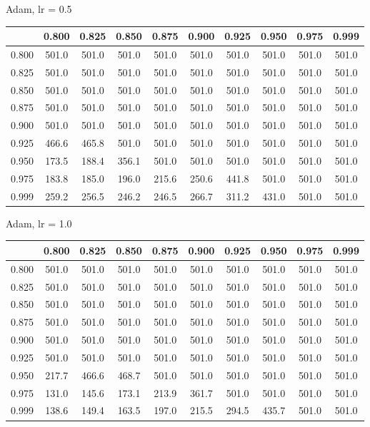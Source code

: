 \documentclass[a4paper,14pt,oneside,openany]{memoir}
\begin{document}
	Adam, lr = 0.5 
	
	\begin{tabular}{|c|c|c|c|c|c|c|c|c|c|}
	\hline 
	 &0.800 &0.825 &0.850 &0.875 &0.900 &0.925 &0.950 &0.975 &0.999 \\
	 \hline 
	0.800 &501.0 &501.0 &501.0 &501.0 &501.0 &501.0 &501.0 &501.0 &501.0 \\
	 \hline 
	0.825 &501.0 &501.0 &501.0 &501.0 &501.0 &501.0 &501.0 &501.0 &501.0 \\
	 \hline 
	0.850 &501.0 &501.0 &501.0 &501.0 &501.0 &501.0 &501.0 &501.0 &501.0 \\
	 \hline 
	0.875 &501.0 &501.0 &501.0 &501.0 &501.0 &501.0 &501.0 &501.0 &501.0 \\
	 \hline 
	0.900 &501.0 &501.0 &501.0 &501.0 &501.0 &501.0 &501.0 &501.0 &501.0 \\
	 \hline 
	0.925 &466.6 &465.8 &501.0 &501.0 &501.0 &501.0 &501.0 &501.0 &501.0 \\
	 \hline 
	0.950 &173.5 &188.4 &356.1 &501.0 &501.0 &501.0 &501.0 &501.0 &501.0 \\
	 \hline 
	0.975 &183.8 &185.0 &196.0 &215.6 &250.6 &441.8 &501.0 &501.0 &501.0 \\
	 \hline 
	0.999 &259.2 &256.5 &246.2 &246.5 &266.7 &311.2 &431.0 &501.0 &501.0 \\
	 \hline 
	
	\end{tabular}
	
	Adam, lr = 1.0 
	
	\begin{tabular}{|c|c|c|c|c|c|c|c|c|c|}
	\hline 
	 &0.800 &0.825 &0.850 &0.875 &0.900 &0.925 &0.950 &0.975 &0.999 \\
	 \hline 
	0.800 &501.0 &501.0 &501.0 &501.0 &501.0 &501.0 &501.0 &501.0 &501.0 \\
	 \hline 
	0.825 &501.0 &501.0 &501.0 &501.0 &501.0 &501.0 &501.0 &501.0 &501.0 \\
	 \hline 
	0.850 &501.0 &501.0 &501.0 &501.0 &501.0 &501.0 &501.0 &501.0 &501.0 \\
	 \hline 
	0.875 &501.0 &501.0 &501.0 &501.0 &501.0 &501.0 &501.0 &501.0 &501.0 \\
	 \hline 
	0.900 &501.0 &501.0 &501.0 &501.0 &501.0 &501.0 &501.0 &501.0 &501.0 \\
	 \hline 
	0.925 &501.0 &501.0 &501.0 &501.0 &501.0 &501.0 &501.0 &501.0 &501.0 \\
	 \hline 
	0.950 &217.7 &466.6 &468.7 &501.0 &501.0 &501.0 &501.0 &501.0 &501.0 \\
	 \hline 
	0.975 &131.0 &145.6 &173.1 &213.9 &361.7 &501.0 &501.0 &501.0 &501.0 \\
	 \hline 
	0.999 &138.6 &149.4 &163.5 &197.0 &215.5 &294.5 &435.7 &501.0 &501.0 \\
	 \hline 
	
	\end{tabular}
	
\end{document}

